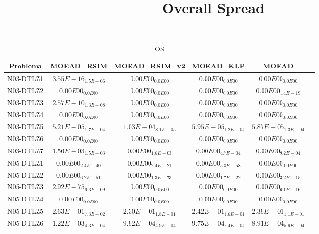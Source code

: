 \documentclass{article}
\title{Overall Spread}
\author{}
\begin{document}
\maketitle
\begin{table*}[ht!]
\scriptsize
\caption{OS}
\centering\begin{tabular}{|c||c||c||c||c||c|} \hline
Problema &MOEAD_RSIM &MOEAD_RSIM_v2 &MOEAD_KLP &MOEAD\\\hline
N03-DTLZ1 &\cellcolor{gray95}$3.55E-16_{1.5E-06}$ &\cellcolor{gray25}$0.00E00_{0.0E00}$ &$0.00E00_{0.0E00}$ &$0.00E00_{0.0E00}$\\ 
\hline
N03-DTLZ2 &\cellcolor{gray95}$0.00E00_{0.0E00}$ &\cellcolor{gray25}$0.00E00_{0.0E00}$ &$0.00E00_{0.0E00}$ &$0.00E00_{1.4E-19}$\\ 
\hline
N03-DTLZ3 &\cellcolor{gray95}$2.57E-10_{1.3E-08}$ &\cellcolor{gray25}$0.00E00_{0.0E00}$ &$0.00E00_{0.0E00}$ &$0.00E00_{0.0E00}$\\ 
\hline
N03-DTLZ4 &\cellcolor{gray95}$0.00E00_{0.0E00}$ &\cellcolor{gray25}$0.00E00_{0.0E00}$ &$0.00E00_{0.0E00}$ &$0.00E00_{0.0E00}$\\ 
\hline
N03-DTLZ5 &$5.21E-05_{1.7E-04}$ &\cellcolor{gray95}$1.03E-04_{8.1E-05}$ &\cellcolor{gray25}$5.95E-05_{1.2E-04}$ &$5.87E-05_{1.3E-04}$\\ 
\hline
N03-DTLZ6 &\cellcolor{gray95}$0.00E00_{0.0E00}$ &\cellcolor{gray25}$0.00E00_{0.0E00}$ &$0.00E00_{0.0E00}$ &$0.00E00_{0.0E00}$\\ 
\hline
N03-DTLZ7 &\cellcolor{gray95}$1.56E-03_{1.5E-03}$ &$0.00E00_{1.6E-03}$ &\cellcolor{gray25}$0.00E00_{4.7E-04}$ &$0.00E00_{9.2E-04}$\\ 
\hline
N05-DTLZ1 &$0.00E00_{2.4E-40}$ &$0.00E00_{2.4E-21}$ &\cellcolor{gray25}$0.00E00_{5.8E-58}$ &\cellcolor{gray95}$0.00E00_{0.0E00}$\\ 
\hline
N05-DTLZ2 &\cellcolor{gray25}$0.00E00_{6.2E-51}$ &\cellcolor{gray95}$0.00E00_{1.3E-73}$ &$0.00E00_{1.7E-22}$ &$0.00E00_{3.2E-15}$\\ 
\hline
N05-DTLZ3 &\cellcolor{gray95}$2.92E-75_{6.3E-09}$ &\cellcolor{gray25}$0.00E00_{0.0E00}$ &$0.00E00_{0.0E00}$ &$0.00E00_{6.1E-16}$\\ 
\hline
N05-DTLZ4 &\cellcolor{gray95}$0.00E00_{0.0E00}$ &\cellcolor{gray25}$0.00E00_{0.0E00}$ &$0.00E00_{0.0E00}$ &$0.00E00_{0.0E00}$\\ 
\hline
N05-DTLZ5 &\cellcolor{gray95}$2.63E-01_{7.3E-02}$ &$2.30E-01_{1.8E-01}$ &\cellcolor{gray25}$2.42E-01_{1.6E-01}$ &$2.39E-01_{1.1E-01}$\\ 
\hline
N05-DTLZ6 &\cellcolor{gray95}$1.22E-03_{4.3E-04}$ &\cellcolor{gray25}$9.92E-04_{4.9E-04}$ &$9.75E-04_{5.4E-04}$ &$8.91E-04_{5.9E-04}$\\ 

\end{tabular}
\end{table*}
\end{document}
